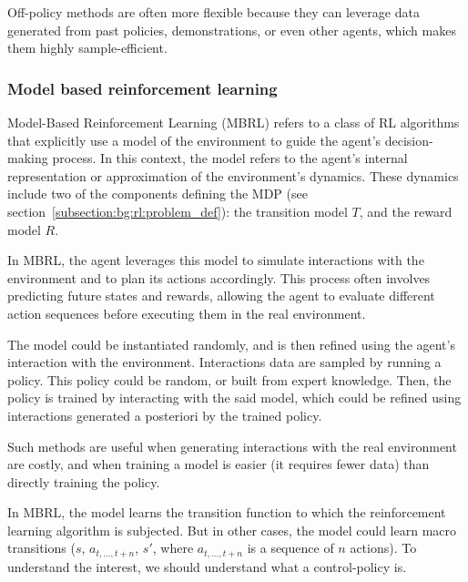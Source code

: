Off-policy methods are often more flexible because they can leverage data generated from past policies, demonstrations,
or even other agents, which makes them highly sample-efficient.

\subsubsection{Model based reinforcement learning}

Model-Based Reinforcement Learning (MBRL) refers to a class of RL algorithms that explicitly
use a model of the environment to guide the agent's decision-making process.
In this context, the model refers to the agent's internal representation or approximation of the environment's dynamics.
These dynamics include two of the components defining the MDP
(see section~\ref{subsection:bg:rl:problem_def}): the transition model $T$,
and the reward model $R$.

In MBRL, the agent leverages this model to simulate interactions with the environment and to plan its actions accordingly.
This process often involves predicting future states and rewards, allowing the agent to evaluate different action
sequences before executing them in the real environment.

The model could be instantiated randomly, and is then refined using the agent's interaction with the environment.
Interactions data are sampled by running a policy.
This policy could be random, or built from expert knowledge.
Then, the policy is trained by interacting with the said model, which could be refined using interactions generated a
posteriori by the trained policy.

Such methods are useful when generating interactions with the real environment are costly, and when training a model
is easier (it requires fewer data) than directly training the policy.

In MBRL, the model learns the transition function to which the reinforcement learning algorithm is subjected.
But in other cases, the model could learn macro transitions ($s$, $a_{t, \dots, t+n}$, $s'$, where $a_{t, \dots, t+n}$
is a sequence of $n$ actions). %
To understand the interest, %
we should understand what a control-policy is.

